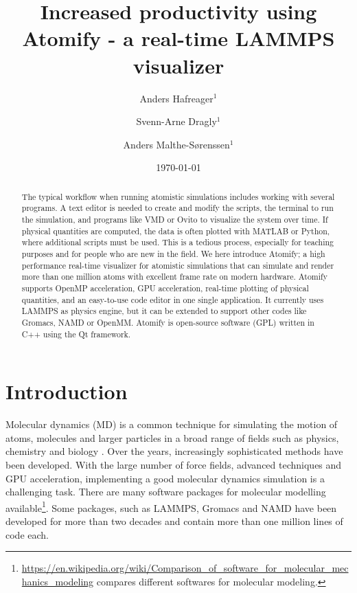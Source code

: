 \documentclass[aps,pre,twocolumn,letterpaper,floatfix,nofootinbib]{revtex4}
\begin{document}
\title{Increased productivity using Atomify - a real-time LAMMPS visualizer}
\author{Anders Hafreager$^1$}
\author{Svenn-Arne Dragly$^{1}$} 
\author{Anders Malthe-S\o renssen$^1$}
\date{\today} 


\begin{abstract}
%
The typical workflow when running atomistic simulations includes working with several programs.
A text editor is needed to create and modify the scripts, the terminal to run the simulation, and programs like VMD or Ovito to visualize the system over time.
If physical quantities are computed, the data is often plotted with MATLAB or Python, where additional scripts must be used.
This is a tedious process, especially for teaching purposes and for people who are new in the field.
We here introduce Atomify; a high performance real-time visualizer for atomistic simulations that can simulate and render more than one million atoms with excellent frame rate on modern hardware.
Atomify supports OpenMP acceleration, GPU acceleration, real-time plotting of physical quantities, and an easy-to-use code editor in one single application.
It currently uses LAMMPS as physics engine, but it can be extended to support other codes like Gromacs, NAMD or OpenMM.
Atomify is open-source software (GPL) written in C++ using the Qt framework.
%
\end{abstract} 
 
\maketitle

\section{Introduction}
%
Molecular dynamics (MD) is a common technique for simulating the motion of atoms,
molecules and larger particles in a broad range of fields such as physics, chemistry and biology \citep{van2001reaxff, allen2017computer, }.
Over the years, increasingly sophisticated methods have been developed.
With the large number of force fields, advanced techniques and GPU acceleration,
implementing a good molecular dynamics simulation is a challenging task.
There are many software packages for molecular modelling
available\footnote{\url{https://en.wikipedia.org/wiki/Comparison_of_software_for_molecular_mechanics_modeling} compares different softwares for molecular modeling.}.
Some packages, such as LAMMPS\citep{Plimpton1995Fast}, Gromacs\citep{berendsen1995gromacs}
and NAMD\citep{Phillips2005Scalable} have been developed for more than two decades 
and contain more than one million lines of code each.
\end{document}
